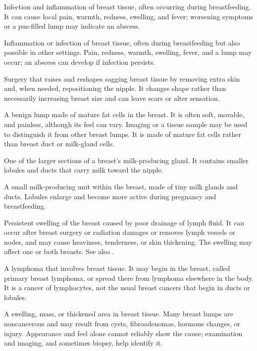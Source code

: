  Infection and inflammation of breast tissue, often occurring during breastfeeding. It can cause local pain, warmth, redness, swelling, and fever; worsening symptoms or a pus-filled lump may indicate an abscess.

 Inflammation or infection of breast tissue, often during breastfeeding but also possible in other settings. Pain, redness, warmth, swelling, fever, and a lump may occur; an abscess can develop if infection persists.

 Surgery that raises and reshapes sagging breast tissue by removing extra skin and, when needed, repositioning the nipple. It changes shape rather than necessarily increasing breast size and can leave scars or alter sensation.

 A benign lump made of mature fat cells in the
  breast. It is often soft, movable, and painless, although its feel can
  vary. Imaging or a tissue sample may be used to distinguish it from
  other breast lumps. It is made of mature fat cells rather than breast
  duct or milk-gland cells.

 One of the larger sections of a breast's milk-producing gland. It contains smaller lobules and ducts that carry milk toward the nipple.

 A small milk-producing unit within the breast, made of tiny milk glands and ducts. Lobules enlarge and become more active during pregnancy and breastfeeding.

 Persistent swelling of the breast caused by
  poor drainage of lymph fluid. It can occur after breast surgery or
  radiation damages or removes lymph vessels or nodes, and may cause
  heaviness, tenderness, or skin thickening. The swelling may affect one
  or both breasts. See also
  .

 A lymphoma that involves breast tissue. It may
  begin in the breast, called primary breast lymphoma, or spread there
  from lymphoma elsewhere in the body. It is a cancer of lymphocytes,
  not the usual breast cancers that begin in ducts or lobules.

 A swelling, mass, or thickened area in breast tissue.
Many breast lumps are noncancerous and may result from cysts, fibroadenomas,
hormone changes, or injury. Appearance and feel alone cannot reliably show
the cause; examination and imaging, and sometimes biopsy, help identify it.

